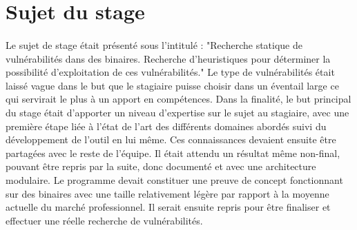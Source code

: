 \section*{Sujet du stage}
\paragraph{}
Le sujet de stage était présenté sous l'intitulé : "Recherche statique de vulnérabilités dans des binaires. Recherche d'heuristiques pour déterminer la possibilité
d'exploitation de ces vulnérabilités." Le type de vulnérabilités était laissé vague dans le but que le stagiaire puisse choisir dans un éventail large ce qui
servirait le plus à un apport en compétences.  Dans la finalité, le but principal du stage était d'apporter un niveau d'expertise sur le sujet au stagiaire,
avec une première étape liée à l'état de l'art des différents domaines abordés suivi du développement de l'outil en lui même. Ces connaissances devaient ensuite être
partagées avec le reste de l'équipe. Il était attendu un résultat même
non-final, pouvant être repris par la suite, donc documenté et avec une architecture modulaire. Le programme devait constituer une preuve de concept fonctionnant
sur des binaires avec une taille relativement légère par rapport à la moyenne actuelle du marché professionnel. Il serait ensuite repris pour être finaliser et effectuer
une réelle recherche de vulnérabilités.
